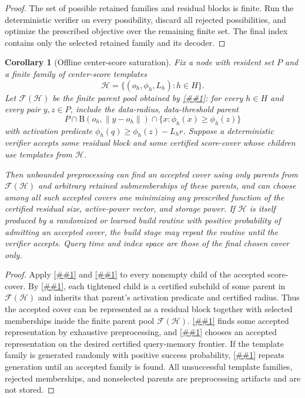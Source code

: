 \documentclass[10pt]{article}
\newcommand{\cref}[1]{\ref{##1}}
\newcommand{\Cref}[1]{\ref{##1}}
\newtheorem{corollary}[theorem]{Corollary}
\theoremstyle{definition}
\newcommand{\Ball}{\mathrm{B}}
\begin{document}
\begin{proof}
   The set of possible retained families and residual blocks is finite.  Run
   the deterministic verifier on every possibility, discard all rejected
   possibilities, and optimize the prescribed objective over the remaining
   finite set.  The final index contains only the selected retained family and
   its decoder.
\end{proof}

\begin{corollary}[Offline center-score saturation]
   \label{cor:offline-center-score-saturation}
   Fix a node with resident set $P$ and a finite family of center-score
   templates
   \[
      \mathcal H=\{(o_h,\phi_h,L_h):h\in H\}.
   \]
   Let $\mathcal F(\mathcal H)$ be the finite parent pool obtained by
   \cref{lem:center-score-closure}: for every $h\in H$ and every pair
   $y,z\in P$, include the data-radius, data-threshold parent
   \[
      P\cap\Ball(o_h,\|y-o_h\|)
      \cap\{x:\phi_h(x)\ge\phi_h(z)\}
   \]
   with activation predicate
   $\phi_h(q)\ge\phi_h(z)-L_hr$.  Suppose a deterministic verifier accepts
   some residual block and some certified score-cover whose children use
   templates from $\mathcal H$.

   Then unbounded preprocessing can find an accepted cover using only parents
   from $\mathcal F(\mathcal H)$ and arbitrary retained submemberships of these
   parents, and can choose among all such accepted covers one minimizing any
   prescribed function of the certified residual size, active-power vector, and
   storage power.  If $\mathcal H$ is itself produced by a randomized or learned
   build routine with positive probability of admitting an accepted cover, the
   build stage may repeat the routine until the verifier accepts.  Query time
   and index space are those of the final chosen cover only.
\end{corollary}

\begin{proof}
   Apply \cref{lem:threshold-tightening} and \cref{lem:radius-tightening} to
   every nonempty child of the accepted score-cover.  By
   \cref{lem:center-score-closure}, each tightened child is a certified
   subchild of some parent in $\mathcal F(\mathcal H)$ and inherits that
   parent's activation predicate and certified radius.  Thus the accepted cover
   can be represented as a residual block together with selected memberships
   inside the finite parent pool $\mathcal F(\mathcal H)$.
   \Cref{lem:finite-pool-optimizer} finds some accepted representation by
   exhaustive preprocessing, and \cref{cor:offline-pareto-compression} chooses
   an accepted representation on the desired certified query-memory frontier.
   If the template family is generated randomly with positive success
   probability, \cref{lem:las-vegas-offline} repeats generation until an
   accepted family is found.  All unsuccessful template families, rejected
   memberships, and nonselected parents are preprocessing artifacts and are not
   stored.
\end{proof}
\end{document}
